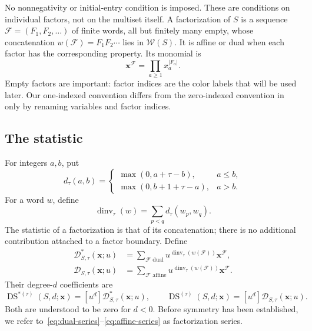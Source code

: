\documentclass[11pt,reqno]{amsart}
\newcommand{\xx}{\mathbf x}
\newcommand{\DS}{\operatorname{DS}}
\newcommand{\DD}{\mathcal D}
\newcommand{\WW}{\mathcal W}
\newcommand{\dinv}{\operatorname{dinv}}
\theoremstyle{definition}
\theoremstyle{remark}
\numberwithin{equation}{section}
\begin{document}
No nonnegativity or initial-entry condition is imposed.  These are
conditions on individual factors, not on the multiset itself.  A
factorization of $S$ is a sequence
$\mathcal F=(F_1,F_2,\ldots)$ of finite words, all but finitely many empty,
whose concatenation $w(\mathcal F)=F_1F_2\cdots$ lies in $\WW(S)$.
It is affine or dual when each factor has the corresponding property.
Its monomial is
\begin{equation}\label{eq:factor-monomial}
 \xx^{\mathcal F}=\prod_{a\geq1}x_a^{|F_a|}.
\end{equation}
Empty factors are important: factor indices are the color labels that
will be used later.  Our one-indexed convention differs from the
zero-indexed convention in~\cite{Hawkes2026} only by renaming variables
and factor indices.

\subsection{The statistic}
For integers $a,b$, put
\begin{equation}\label{eq:pair-stat}
 d_\tau(a,b)=
 \begin{cases}
  \max(0,a+\tau-b),&a\leq b,\\
  \max(0,b+1+\tau-a),&a>b.
 \end{cases}
\end{equation}
For a word $w$, define
\begin{equation}\label{eq:dinv}
 \dinv_\tau(w)=\sum_{p<q}d_\tau(w_p,w_q).
\end{equation}
The statistic of a factorization is that of its concatenation; there is
no additional contribution attached to a factor boundary.  Define
\begin{align}
 \DD^*_{S,\tau}(\xx;u)
   &=\sum_{\mathcal F\text{ dual}}u^{\dinv_\tau(w(\mathcal F))}
            \xx^{\mathcal F},\label{eq:dual-series}\\
 \DD_{S,\tau}(\xx;u)
   &=\sum_{\mathcal F\text{ affine}}u^{\dinv_\tau(w(\mathcal F))}
            \xx^{\mathcal F}.\label{eq:affine-series}
\end{align}
Their degree-$d$ coefficients are
\begin{equation}\label{eq:degree-d}
 \DS^{*(\tau)}(S,d;\xx)=[u^d]\DD^*_{S,\tau}(\xx;u),\qquad
 \DS^{(\tau)}(S,d;\xx)=[u^d]\DD_{S,\tau}(\xx;u).
\end{equation}
Both are understood to be zero for $d<0$.  Before symmetry has been
established, we refer to~\eqref{eq:dual-series}--\eqref{eq:affine-series}
as factorization series.
\end{document}
